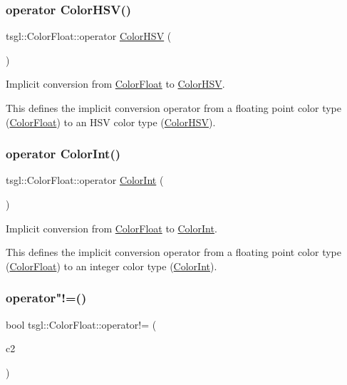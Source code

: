 \subsubsection{\texorpdfstring{operator Color\+H\+S\+V()}{operator ColorHSV()}}
{\footnotesize\ttfamily tsgl\+::\+Color\+Float\+::operator \hyperlink{structtsgl_1_1_color_h_s_v}{Color\+H\+SV} (\begin{DoxyParamCaption}{ }\end{DoxyParamCaption})}



Implicit conversion from \hyperlink{structtsgl_1_1_color_float}{Color\+Float} to \hyperlink{structtsgl_1_1_color_h_s_v}{Color\+H\+SV}. 

This defines the implicit conversion operator from a floating point color type (\hyperlink{structtsgl_1_1_color_float}{Color\+Float}) to an H\+SV color type (\hyperlink{structtsgl_1_1_color_h_s_v}{Color\+H\+SV}). \mbox{\label{structtsgl_1_1_color_float_a4ef5398fd1ee469dd9b1b43c9ce5c00d}} 
\subsubsection{\texorpdfstring{operator Color\+Int()}{operator ColorInt()}}
{\footnotesize\ttfamily tsgl\+::\+Color\+Float\+::operator \hyperlink{structtsgl_1_1_color_int}{Color\+Int} (\begin{DoxyParamCaption}{ }\end{DoxyParamCaption})}



Implicit conversion from \hyperlink{structtsgl_1_1_color_float}{Color\+Float} to \hyperlink{structtsgl_1_1_color_int}{Color\+Int}. 

This defines the implicit conversion operator from a floating point color type (\hyperlink{structtsgl_1_1_color_float}{Color\+Float}) to an integer color type (\hyperlink{structtsgl_1_1_color_int}{Color\+Int}). \mbox{\label{structtsgl_1_1_color_float_afd92fcf8743d931cfbcf405209c923fc}} 
\subsubsection{\texorpdfstring{operator"!=()}{operator!=()}}
{\footnotesize\ttfamily bool tsgl\+::\+Color\+Float\+::operator!= (\begin{DoxyParamCaption}\item[{\hyperlink{structtsgl_1_1_color_float}{Color\+Float} \&}]{c2 }\end{DoxyParamCaption})}



